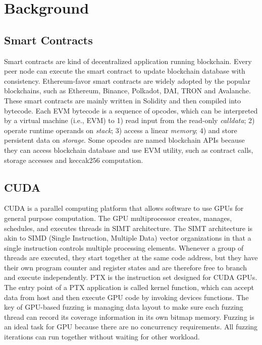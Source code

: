 \section{Background}

\subsection{Smart Contracts}
Smart contracts are kind of decentralized application running blockchain. 
Every peer node can execute the smart contract to update blockchain database with consistency. 
Ethereum-favor smart contracts are widely adopted by the popular blockchains, such as Ethereum\cite{wood2014ethereum}, Binance\cite{}, Polkadot\cite{}, DAI\cite{}, TRON\cite{} and Avalanche\cite{}.
These smart contracts are mainly written in Solidity\cite{solidity} and then compiled into bytecode.
Each EVM bytecode is a sequence of opcodes, which can be interpreted by a virtual machine (i.e., EVM) to 1) read input from the read-only \textit{calldata}; 2) operate runtime operands on \textit{stack}; 3) access a linear \textit{memory}; 4) and store persistent data on \textit{storage}.
Some opcodes are named blockchain APIs because they can access blockchain database and use EVM utility, such as contract calls, storage accesses and keccak256 computation. 

\subsection{CUDA}
CUDA is a parallel computing platform that allows software to use GPUs for general purpose computation. 
The GPU multiprocessor creates, manages, schedules, and executes threads in SIMT architecture.
The SIMT architecture is akin to SIMD (Single Instruction, Multiple Data) vector organizations in that a single instruction controls multiple processing elements.
Whenever a group of threads are executed, they start together at the same code address, but they have their own program counter and register states and are therefore free to branch and execute independently.
PTX is the instruction set designed for CUDA GPUs.
The entry point of a PTX application is called kernel function, which can accept data from host and then execute GPU code by invoking devices functions. 
%
The key of GPU-based fuzzing is managing data layout to make sure each fuzzing thread can record its coverage information in its own bitmap memory.   
Fuzzing is an ideal task for GPU because there are no concurrency requirements. All fuzzing iterations can run together without waiting for other workload. 